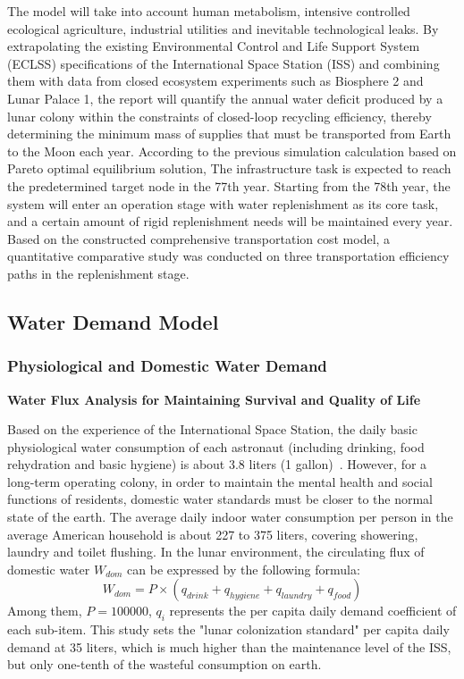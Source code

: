 The model will take into account human metabolism, intensive controlled ecological agriculture, industrial utilities and inevitable technological leaks.
By extrapolating the existing Environmental Control and Life Support System (ECLSS) specifications of the International Space Station (ISS) and combining them with data from closed ecosystem experiments such as Biosphere 2 and Lunar Palace 1, the report will quantify the annual water deficit produced by a lunar colony within the constraints of closed-loop recycling efficiency, thereby determining the minimum mass of supplies that must be transported from Earth to the Moon each year.
According to the previous simulation calculation based on Pareto optimal equilibrium solution, 
The infrastructure task is expected to reach the predetermined target node in the 77th year. Starting from the 78th year, the system will enter an operation stage with water replenishment as its core task, and a certain amount of rigid replenishment needs will be maintained every year. 
Based on the constructed comprehensive transportation cost model, a quantitative comparative study was conducted on three transportation efficiency paths in the replenishment stage.

\subsection{Water Demand Model}
\subsubsection{Physiological and Domestic Water Demand}

\medskip
\noindent\textbf{Water Flux Analysis for Maintaining Survival and Quality of Life}\par
Based on the experience of the International Space Station, the daily basic physiological water consumption of each astronaut (including drinking, food rehydration and basic hygiene) is about 3.8 liters (1 gallon)~\cite{nasa_iss_water_recovery}.
However, for a long-term operating colony, in order to maintain the mental health and social functions of residents, domestic water standards must be closer to the normal state of the earth.
The average daily indoor water consumption per person in the average American household is about 227 to 375 liters, covering showering, laundry and toilet flushing.
In the lunar environment, the circulating flux of domestic water $W_{dom}$ can be expressed by the following formula:
\[W_{dom}=P\times(q_{drink}+q_{hygiene}+q_{laundry}+q_{food})\]
\indent Among them, $P = 100000$, $q_i$ represents the per capita daily demand coefficient of each sub-item.
This study sets the "lunar colonization standard" per capita daily demand at 35 liters, which is much higher than the maintenance level of the ISS, but only one-tenth of the wasteful consumption on earth.

